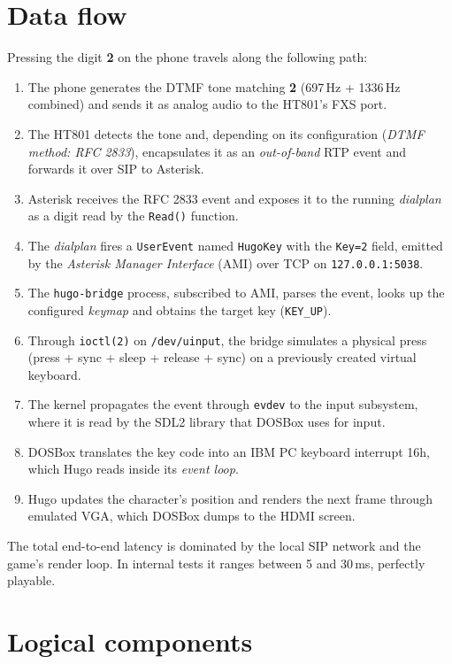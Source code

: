 \section{Data flow}

Pressing the digit \textbf{2} on the phone travels along the following path:

\begin{enumerate}
  \item The phone generates the DTMF tone matching \textbf{2} (697\,Hz + 1336\,Hz combined) and sends it as analog audio to the HT801's FXS port.
  \item The HT801 detects the tone and, depending on its configuration (\emph{DTMF method: RFC 2833}), encapsulates it as an \emph{out-of-band} RTP event and forwards it over SIP to Asterisk.
  \item Asterisk receives the RFC 2833 event and exposes it to the running \emph{dialplan} as a digit read by the \texttt{Read()} function.
  \item The \emph{dialplan} fires a \texttt{UserEvent} named \texttt{HugoKey} with the \texttt{Key=2} field, emitted by the \emph{Asterisk Manager Interface} (AMI) over TCP on \texttt{127.0.0.1:5038}.
  \item The \texttt{hugo-bridge} process, subscribed to AMI, parses the event, looks up the configured \emph{keymap} and obtains the target key (\texttt{KEY\_UP}).
  \item Through \texttt{ioctl(2)} on \texttt{/dev/uinput}, the bridge simulates a physical press (press + sync + sleep + release + sync) on a previously created virtual keyboard.
  \item The kernel propagates the event through \texttt{evdev} to the input subsystem, where it is read by the SDL2 library that DOSBox uses for input.
  \item DOSBox translates the key code into an IBM PC keyboard interrupt 16h, which Hugo reads inside its \emph{event loop}.
  \item Hugo updates the character's position and renders the next frame through emulated VGA, which DOSBox dumps to the HDMI screen.
\end{enumerate}

The total end-to-end latency is dominated by the local SIP network and the game's render loop. In internal tests it ranges between 5 and 30\,ms, perfectly playable.

\section{Logical components}

